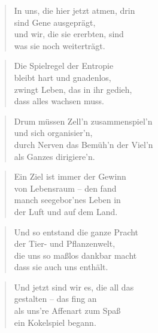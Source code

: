 \documentclass[10pt,a4paper]{article}
\begin{document}
\begin{multicols}{2}
\begin{verse}
In uns, die hier jetzt atmen, drin \\
sind Gene ausgeprägt, \\
und wir, die sie ererbten, sind \\
was sie noch weiterträgt. \\
\end{verse}

\begin{verse}
Die Spielregel der Entropie \\
bleibt hart und gnadenlos, \\
zwingt Leben, das in ihr gedieh, \\
dass alles wachsen muss. \\
\end{verse}

\begin{verse}
Drum müssen Zell’n zusammenspiel’n \\
und sich organisier’n, \\
durch Nerven das Bemüh’n der Viel’n \\
als Ganzes dirigiere’n. \\
\end{verse}

\begin{verse}
Ein Ziel ist immer der Gewinn \\
von Lebensraum – den fand \\
manch seegebor’nes Leben in \\
der Luft und auf dem Land. \\
\end{verse}

\begin{verse}
Und so entstand die ganze Pracht \\
der Tier- und Pflanzenwelt, \\
die uns so maßlos dankbar macht \\
dass sie auch uns enthält. \\
\end{verse}

\begin{verse}
Und jetzt sind wir es, die all das \\
gestalten – das fing an \\
als uns’re Affenart zum Spaß \\
ein Kokelspiel begann. \\
\end{verse}


\end{multicols}
\end{document}
